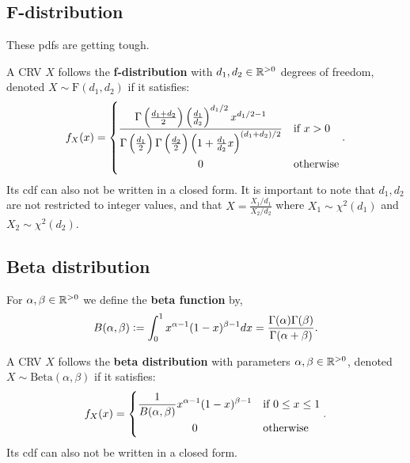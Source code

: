 \documentclass[../Year1/Year1.tex]{subfiles}
\begin{document}
\subsection{F-distribution}
These pdfs are getting tough.
\begin{definition}[F-distribution]
    A CRV $X$ follows the \textbf{f-distribution} with $d_1,d_2\in\mathbb{R}^{>0}$ degrees of freedom, denoted $X\sim \text{F}(d_1,d_2)$ if it satisfies: \[
        f_X(x) = \begin{dcases}
            \frac
            {\Gamma\left(\frac{d_1+d_2}{2_{}}\right)\left(\frac{d_1}{d_2}\right)^{d_1/2}x^{d_1/2-1}}
            {\Gamma\left(\frac{d_1}{2_{}}\right)\Gamma\left(\frac{d_2}{2_{}}\right)\left(1+\frac{d_1}{d_2}x\right)^{(d_1+d_2)/2}}
            & \text{\textcolor{black}{if }$x>0$} \\
            \omit\hfil0\hfil & \text{\textcolor{black}{otherwise}}
        \end{dcases}\textcolor{black}{.}
    \]
    Its cdf can also not be written in a closed form. It is important to note that $d_1,d_2$ are not restricted to integer values, and that $X = \frac{X_1/d_1}{X_2/d_2}$ where $X_1\sim \chi^2(d_1)$ and $X_2\sim \chi^2(d_2)$.
\end{definition}
\subsection{Beta distribution}

\begingroup\belowdisplayskip=-0pt
\begin{definition}
    For $\alpha,\beta\in\mathbb{R}^{>0}$ we define the \textbf{beta function} by, \[
    B(\alpha,\beta) := \int_0^1 x^{\alpha-1}(1-x)^{\beta-1}dx = \frac{\Gamma(\alpha)\Gamma(\beta)}{\Gamma(\alpha+\beta)}
    \textcolor{black}{.}\]
\end{definition}
\endgroup

\begin{definition}
    A CRV $X$ follows the \textbf{beta distribution} with parameters $\alpha,\beta\in\mathbb{R}^{>0}$, denoted $X\sim \text{Beta}(\alpha,\beta)$ if it satisfies: \[
        f_X(x) = \begin{dcases}
            \frac{1}{B(\alpha,\beta)}x^{\alpha-1}(1-x)^{\beta-1} & \text{\textcolor{black}{if }$0\leq x\leq 1$} \\
            \omit\hfil0\hfil & \text{\textcolor{black}{otherwise}}
        \end{dcases}\textcolor{black}{.}
    \]
    Its cdf can also not be written in a closed form.
\end{definition}
\end{document}
